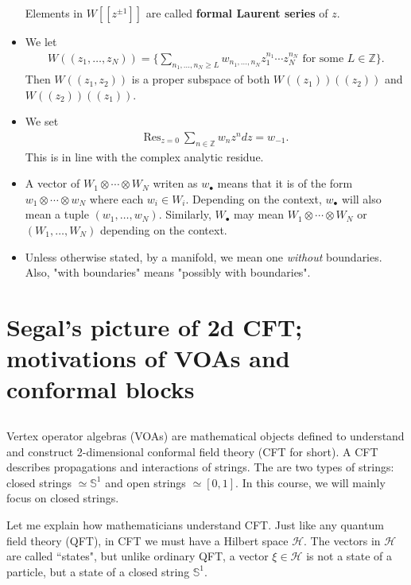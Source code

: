\documentclass[12pt,a4paper,notitlepage]{article}
\theoremstyle{definition}
\theoremstyle{plain}
\newcommand{\mc}{\mathcal}
\newcommand{\Res}{\mathrm{Res}}
\newcommand{\blt}{\bullet}
\newcommand{\Zbb}{\mathbb Z}
\newcommand{\Sbb}{{\mathbb S}}
\numberwithin{equation}{section}
\begin{document}
\begin{itemize}
Elements in $W[[z^{\pm1}]]$ are called \textbf{formal Laurent series} of $z$.

\item We let
\begin{align*}
W((z_1,\dots,z_N))=\Big\{\sum_{n_1,\dots,n_N\geq L}w_{n_1,\dots,n_N}z_1^{n_1}\cdots z_N^{n_N}\text{ for some }L\in\Zbb\Big\}.
\end{align*}
Then $W((z_1,z_2))$ is a proper subspace of both $W((z_1))((z_2))$ and $W((z_2))((z_1))$.
\item We set
\begin{align}\label{eq18}
	\Res_{z=0}~\sum_{n\in\Zbb}w_nz^ndz=w_{-1}.
\end{align}
This is in line with the complex analytic residue.

\item A vector of $W_1\otimes\cdots\otimes W_N$ writen as $w_\blt$ means that it is of the form $w_1\otimes\cdots\otimes w_N$ where each $w_i\in W_i$. Depending on the context, $w_\blt$ will also mean a tuple $(w_1,\dots,w_N)$. Similarly, $W_\blt$ may mean $W_1\otimes\cdots\otimes W_N$ or $(W_1,\dots,W_N)$ depending on the context.

\item Unless otherwise stated, by a manifold, we mean one \emph{without} boundaries. Also, "with boundaries" means "possibly with boundaries".
\end{itemize}

\newpage


\section{Segal's picture of 2d CFT; motivations of VOAs and conformal blocks}

\subsection{}

Vertex operator algebras (VOAs) are mathematical objects defined to understand and construct 2-dimensional conformal field theory (CFT for short). A CFT describes propagations and interactions of strings. The are two types of strings: closed strings $\simeq\Sbb^1$ and open strings $\simeq[0,1]$. In this course, we will mainly focus on closed strings.

Let me explain how mathematicians understand CFT. Just like any quantum field theory (QFT), in CFT we must have a Hilbert space $\mc H$. The vectors in $\mc H$ are called ``states", but unlike ordinary QFT, a vector $\xi\in\mc H$ is not a state of a particle, but a state of a closed string $\Sbb^1$.
\end{document}
